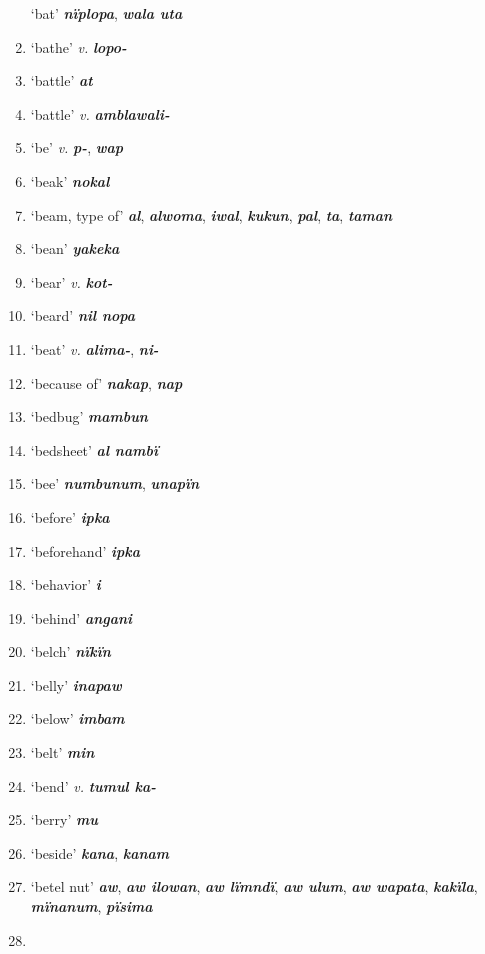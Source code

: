 \begin{enumerate}[noitemsep, label={}, align=left, widest=190, labelsep=1ex,leftmargin=*,itemindent=-10pt]
‘bat’ \textbf{\textit{nïplopa}}, \textbf{\textit{wala uta}} \item
‘bathe’ \textit{v.} \textbf{\textit{lopo-}} \item
‘battle’ \textbf{\textit{at}} \item
‘battle’ \textit{v.} \textbf{\textit{amblawali-}} \item
‘be’ \textit{v.} \textbf{\textit{p-}}, \textbf{\textit{wap}} \item
‘beak’ \textbf{\textit{nokal}} \item
‘beam, type of’ \textbf{\textit{al}}, \textbf{\textit{alwoma}}, \textbf{\textit{iwal}}, \textbf{\textit{kukun}}, \textbf{\textit{pal}}, \textbf{\textit{ta}}, \textbf{\textit{taman}} \item
‘bean’ \textbf{\textit{yakeka}} \item
‘bear’ \textit{v.} \textbf{\textit{kot-}} \item
‘beard’ \textbf{\textit{nil nopa}} \item
‘beat’ \textit{v.} \textbf{\textit{alima-}}, \textbf{\textit{ni-}} \item
‘because of’ \textbf{\textit{nakap}}, \textbf{\textit{nap}} \item
‘bedbug’ \textbf{\textit{mambun}} \item
‘bedsheet’ \textbf{\textit{al nambï}} \item
‘bee’ \textbf{\textit{numbunum}}, \textbf{\textit{unapïn}} \item
‘before’ \textbf{\textit{ipka}} \item
‘beforehand’ \textbf{\textit{ipka}} \item
‘behavior’ \textbf{\textit{i}} \item
‘behind’ \textbf{\textit{angani}} \item
‘belch’ \textbf{\textit{nïkïn}} \item
‘belly’ \textbf{\textit{inapaw}} \item
‘below’ \textbf{\textit{imbam}} \item
‘belt’ \textbf{\textit{min}} \item
‘bend’ \textit{v.} \textbf{\textit{tumul ka-}} \item
‘berry’ \textbf{\textit{mu}} \item
‘beside’ \textbf{\textit{kana}}, \textbf{\textit{kanam}} \item
‘betel nut’ \textbf{\textit{aw}}, \textbf{\textit{aw ilowan}}, \textbf{\textit{aw lïmndï}}, \textbf{\textit{aw ulum}}, \textbf{\textit{aw wapata}}, \textbf{\textit{kakïla}}, \linebreak \textbf{\textit{mïnanum}}, \textbf{\textit{pïsima}} \item

\end{enumerate}

